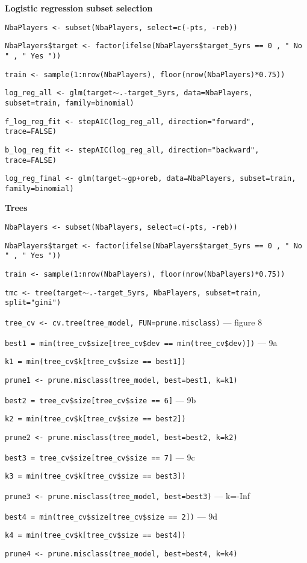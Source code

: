 \noindent
\textbf{Logistic regression subset selection}

\begin{center}
\texttt{NbaPlayers <- subset(NbaPlayers, select=c(-pts, -reb))}

\texttt{NbaPlayers\$target <- factor(ifelse(NbaPlayers\$target\_5yrs == 0 , " No " , " Yes "))}

\texttt{train <- sample(1:nrow(NbaPlayers), floor(nrow(NbaPlayers)*0.75))}

\texttt{log\_reg\_all <- glm(target$\sim$.-target\_5yrs, data=NbaPlayers, subset=train, family=binomial)}

\texttt{f\_log\_reg\_fit <- stepAIC(log\_reg\_all, direction="forward", trace=FALSE)}

\texttt{b\_log\_reg\_fit <- stepAIC(log\_reg\_all, direction="backward", trace=FALSE)}

\texttt{log\_reg\_final <- glm(target$\sim$gp+oreb, data=NbaPlayers, subset=train, family=binomial)}
\end{center}
	
\noindent
\textbf{Trees}

\begin{center}
\texttt{NbaPlayers <- subset(NbaPlayers, select=c(-pts, -reb))}

\texttt{NbaPlayers\$target <- factor(ifelse(NbaPlayers\$target\_5yrs == 0 , " No " , " Yes "))}

\texttt{train <- sample(1:nrow(NbaPlayers), floor(nrow(NbaPlayers)*0.75))}

\texttt{tmc <- tree(target$\sim$.-target\_5yrs, NbaPlayers, subset=train, split="gini")}

\texttt{tree\_cv <- cv.tree(tree\_model, FUN=prune.misclass)} --- figure 8

\texttt{best1 = min(tree\_cv\$size[tree\_cv\$dev == min(tree\_cv\$dev)])} --- 9a

\texttt{k1 = min(tree\_cv\$k[tree\_cv\$size == best1])}

\texttt{prune1 <- prune.misclass(tree\_model, best=best1, k=k1)}

\texttt{best2 = tree\_cv\$size[tree\_cv\$size == 6]} --- 9b

\texttt{k2 = min(tree\_cv\$k[tree\_cv\$size == best2])}

\texttt{prune2 <- prune.misclass(tree\_model, best=best2, k=k2)}

\texttt{best3 = tree\_cv\$size[tree\_cv\$size == 7]} --- 9c

\texttt{k3 = min(tree\_cv\$k[tree\_cv\$size == best3])}

\texttt{prune3 <- prune.misclass(tree\_model, best=best3)} --- k=-Inf

\texttt{best4 = min(tree\_cv\$size[tree\_cv\$size == 2])} --- 9d

\texttt{k4 = min(tree\_cv\$k[tree\_cv\$size == best4])}

\texttt{prune4 <- prune.misclass(tree\_model, best=best4, k=k4)}
\end{center}


